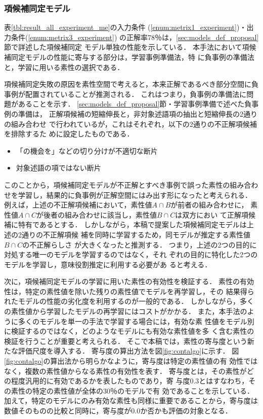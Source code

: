 \documentclass[japanese]{jnlp_1.2b}
\begin{document}
\subsubsection*{項候補同定モデル}
表\ref{tbl:result_all_experiment_me}の入力条件
(\ref{enum:metrix1_experiment})・出力条件(\ref{enum:metrix3_experiment})
の正解率78％は，\ref{sec:models_def_proposal}節で詳述した項候補同定
モデル単独の性能を示している．
本手法において項候補同定モデルの性能に寄与する部分は，学習事例準備法，特
に負事例の準備法と，学習に用いる素性の選択である．

項候補同定失敗の原因を素性空間で考えると，本来正解であるべき部分空間に負
事例が配置されていることが推測される．
これはつまり，負事例の準備法に問題があることを示す．
\ref{sec:models_def_proposal}節・学習事例準備で述べた負事例の準備は，
正解項候補の短縮伸長と，非対象述語項の抽出と短縮伸長の2通りの組み合わせ
で行われているが，これはそれぞれ，以下の2通りの不正解項候補を排除するた
めに設定したものである．

\begin{itemize}
 \item 「の機会を」などの切り分けが不適切な断片
 \item 対象述語の項ではない断片
\end{itemize}
このことから，項候補同定モデルが不正解とすべき事例で誤った素性の組み合わ
せを学習し，結果的に負事例が正解空間にはみ出す形になったと考えられる．
例えば，上述の不正解項候補において，素性値$A \cap B$が前者の組み合わせに，
素性値$A \cap C$が後者の組み合わせに該当し，素性値$B \cap C$は双方におい
て正解項候補に特有であるとする．
しかしながら，本稿で提案した項候補同定モデルは上述の2通りの不正解項候
補を同時に学習するため，同モデルが推定する素性値$B \cap C$の不正解らしさ
が大きくなったと推測する．
つまり，上述の2つの目的に対処する唯一のモデルを学習するのではなく，それ
ぞれの目的に特化した2つのモデルを学習し，意味役割推定に利用する必要があ
ると考える．




次に，項候補同定モデルの学習に用いた素性の有効性を検証する．
素性の有効性は，特定の素性値を除いた残りの素性値でモデルを再学習し，その
結果得られたモデルの性能の劣化度を利用するのが一般的である．
しかしながら，多くの素性値から学習したモデルの再学習にはコストがかかる．
また，本手法のように多くのモデルを単一の手法で学習する場合には，有効な素
性値をモデル別に検証するのではなく，どのようなモデルにも有効な素性値を多
く含む素性の検証を行うことが重要と考えられる．
そこで本稿では，素性の寄与度という新たな評価尺度を導入する．
寄与度の算出方法を図\ref{fig:contalgo}に示す．
図\ref{fig:contalgo}の算出法から明らかなように，寄与度は特定の素性値の有
効性ではなく，複数の素性値からなる素性の有効性を表す．
寄与度とは，その素性がどの程度汎用的に有効であるかを表したものであり，寄
与度$0.3$とはすなわち，その素性の特定の素性値が全体の30％のモデルで有
効であることを示している．
加えて，特定のモデルにのみ有効な素性も同様に重要であることから，寄与度は
数値そのものの比較と同時に，寄与度が$0.0$か否かも評価の対象となる．
\end{document}
